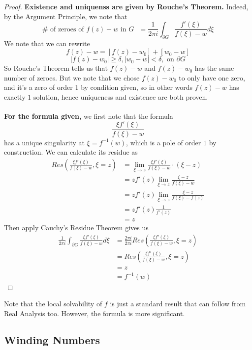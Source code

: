 \begin{proof}
\textbf{Existence and uniquenss are given by Rouche's Theorem.} Indeed, by the Argument Principle, we note that
\[\# \text{ of zeroes of $f(z) - w$ in $G$ } = \frac{1}{2\pi i} \int_{\partial G} \frac{f'(\xi)}{f(\xi) - w} d\xi\]
We note that we can rewrite
\[f(z) - w = [f(z) - w_0] + [w_0 - w]\]
\[|f(z) - w_0| \geq \delta, |w_0 - w| < \delta, \text{ on $\partial G$}\]
So Rouche's Theorem tells us that $f(z) - w$ and $f(z) - w_0$ has the same number of zeroes. But we note that we chose $f(z) - w_0$ to only have one zero, and it's a zero of order $1$ by condition given, so in other words $f(z) - w$ has exactly $1$ solution, hence uniqueness and existence are both proven.\\\\
\textbf{For the formula given, } we first note that the formula
\[\frac{\xi f'(\xi)}{f(\xi) - w}\]
has a unique singularity at $\xi = f^{-1}(w)$, which is a pole of order $1$ by construction. We can calculate its residue as
\begin{align*}
    Res(\frac{\xi f'(\xi)}{f(\xi) - w}, \xi = z) &= \lim_{\xi \to z} \frac{\xi f'(\xi)}{f(\xi) - w} \cdot (\xi - z)\\
    &= z f'(z) \lim_{\xi \to z} \frac{\xi - z}{f(\xi) - w}\\
    &= z f'(z) \lim_{\xi \to z} \frac{\xi - z}{f(\xi) - f(z)} \tag*{$w$ is defined to be $w = f(z)$}\\
    &= z f'(z) \frac{1}{f'(z)}\\
    &= z
\end{align*}
Then apply Cauchy's Residue Theorem gives us
\begin{align*}
    \frac{1}{2\pi i} \int_{\partial G} \frac{\xi f'(\xi)}{f(\xi) - w} d\xi &= \frac{2\pi i}{2\pi i} Res(\frac{\xi f'(\xi)}{f(\xi) - w}, \xi = z)\\
    &= Res(\frac{\xi f'(\xi)}{f(\xi) - w}, \xi = z)\\
    &= z\\
    &= f^{-1}(w)
\end{align*}
\end{proof}

Note that the local solvability of $f$ is just a standard result that can follow from Real Analysis too. However, the formula is more significant.

\subsection{Winding Numbers}


